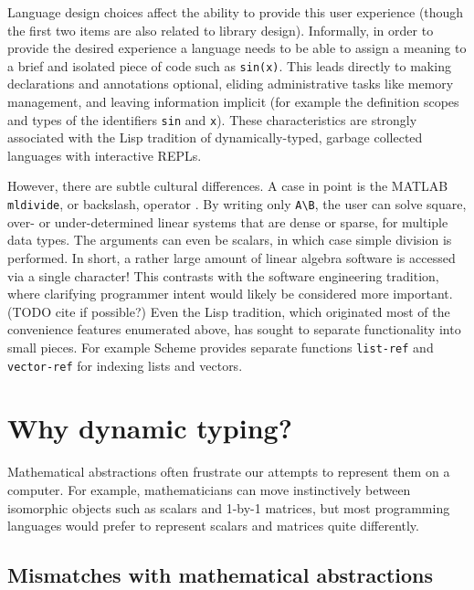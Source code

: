 {Language design choices affect the ability to provide this
user experience (though the first two items are also related to
library design). Informally, in order to provide
the desired experience a language needs to be able to assign a
meaning to a brief and isolated piece of code such as \texttt{sin(x)}.
This leads directly to making declarations and annotations optional,
eliding administrative tasks like memory management, and leaving
information implicit (for example the definition scopes and types of the
identifiers \texttt{sin} and \texttt{x}).
These characteristics are strongly associated
with the Lisp tradition of dynamically-typed, garbage collected
languages with interactive REPLs.

However, there are subtle cultural differences. A case in point is the
MATLAB \texttt{mldivide}, or backslash, operator \cite{matlabman:mldivide}.
By writing only \texttt{A\textbackslash B}, the user can solve square,
over- or under-determined linear systems that are dense or sparse, for multiple
data types. The arguments can even be scalars, in which case simple
division is performed. In short, a rather large amount of linear algebra
software is accessed via a single character! This contrasts with the
software engineering tradition, where clarifying programmer intent would
likely be considered more important. (TODO cite if possible?)
Even the Lisp tradition, which originated most of the convenience features
enumerated above, has sought to separate functionality into small pieces.
For example Scheme provides separate functions \texttt{list-ref} and
\texttt{vector-ref} \cite{schemelang} for indexing lists and vectors.



\section{Why dynamic typing?}

Mathematical abstractions often frustrate our attempts to represent them
on a computer. For example, mathematicians can move instinctively between
isomorphic objects such as scalars and 1-by-1 matrices, but most programming
languages would prefer to represent scalars and matrices quite differently.


\subsection{Mismatches with mathematical abstractions}

}
